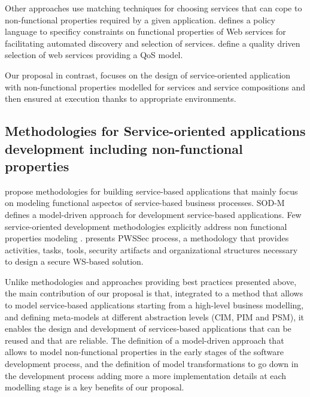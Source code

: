 Other approaches \cite{JeongCL09,Kamalabad2012,MohantyRP10} use matching techniques for choosing services that can cope to non-functional properties required by a given application.
\cite{AgarwalLS09} defines a policy language to specificy constraints on functional  properties of Web services for facilitating automated discovery and selection of services. 
\cite{Yeom2006} define a quality driven selection of web services providing a QoS model.





Our proposal in contrast, focuses on the design of service-oriented application with non-functional properties modelled  for services and service compositions and then ensured at execution thanks to appropriate environments.


\subsection{Methodologies for Service-oriented applications development  including non-func\-tion\-al properties}

 \cite{Ramollari_asurvey,PapazoglouH06,FeuerlichtM05,soma,Arsanjani:2008} propose methodologies for building service-based applications that  mainly focus on modeling functional aspectos of service-based business processes. SOD-M \cite{decastro1} defines a model-driven approach for development service-based applications. 
Few service-oriented development methodologies    explicitly address  non functional properties modeling \cite{Tran2012531,GutierrezRF10}. \cite{GutierrezRF10} presents PWSSec process, a methodology that provides  activities, tasks, tools, security artifacts and organizational structures necessary to design a secure WS-based solution. 



Unlike methodologies and approaches providing best practices presented above, the main contribution of our proposal is that, integrated to a method that allows to model service-based applications starting from a high-level business modelling, and defining meta-models at different abstraction levels (CIM, PIM and PSM), it enables the design and development of services-based applications that can be reused and that are reliable. The definition of a model-driven approach that allows to model non-functional properties in the early stages of the software development process, and the definition of model transformations to go down in the development process adding more a more implementation details at each modelling stage is a key benefits of our proposal.

